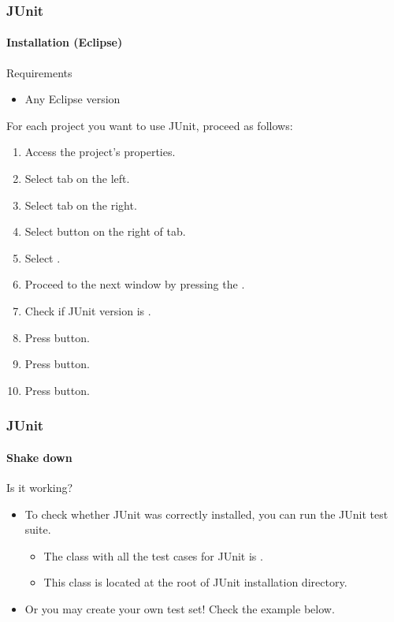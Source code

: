 \begin{frame}
\frametitle{JUnit}
\framesubtitle{Installation (Eclipse)}
\label{procedure:junit:installation:eclipse}


\begin{block:fact}{Requirements}
	\begin{itemize}
		\item Any Eclipse version
	\end{itemize}
\end{block:fact}

\begin{block:procedure}{}
	For each project you want to use JUnit, proceed as follows:
	\begin{enumerate}
		\item Access the project's properties.
		\item Select  tab on the left.
		\item Select  tab on the right.
		\item Select  button on the right of  tab.
		\item Select .
		\item Proceed to the next window by pressing the .
		\item Check if JUnit version is .
		\item Press  button.
		\item Press  button.
		\item Press  button.
	\end{enumerate}
\end{block:procedure}
\end{frame}


\begin{frame}[hasprev=true, hasnext=false]
\frametitle{JUnit}
\framesubtitle{Shake down}
\label{procedure:junit:shakedown}


\begin{block:fact}{Is it working?}
\begin{itemize}
	\item To check whether JUnit was correctly installed, you can run the JUnit
	test suite.
	\begin{itemize}
		\item The class with all the test cases for JUnit is
		.

		\item This class is located at the root of JUnit installation directory.
	\end{itemize}

	\item Or you may create your own test set! Check the example below.
\end{itemize}
\end{block:fact}


\hfill
{}
\end{frame}
